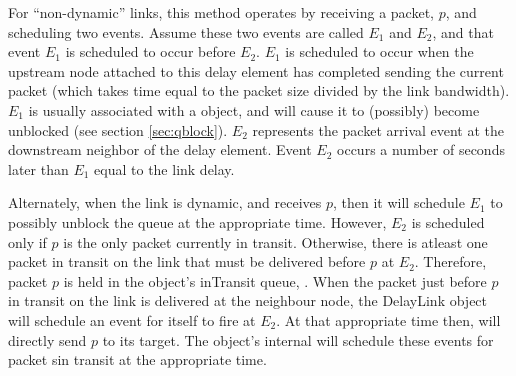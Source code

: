 For ``non-dynamic'' links,
this method operates by receiving a packet, $p$,  and scheduling two
events.
Assume these two events are called $E_1$ and $E_2$, and that
event $E_1$ is scheduled to occur before $E_2$.
$E_1$ is scheduled to occur when the upstream node attached to this
delay element has completed sending the current packet
(which takes time equal to the packet size divided by the link bandwidth).
$E_1$ is usually associated with a  object, and will
cause it to (possibly) become unblocked (see section \ref{sec:qblock}).
$E_2$ represents the packet arrival event at the downstream neighbor
of the delay element.
Event $E_2$ occurs a number of seconds later than $E_1$ equal to the
link delay.

Alternately, when the link is dynamic, and receives  $p$, then
it will schedule $E_1$ to possibly unblock the queue at the
appropriate time.
However, $E_2$ is scheduled only
if $p$ is the only packet currently in transit.
Otherwise, there is atleast one packet in transit on the link that must
be delivered before $p$ at $E_2$.
Therefore, packet $p$ is held in the object's inTransit queue, .
When the packet just before $p$ in transit on the link is delivered
at the neighbour node, 
the DelayLink object will schedule an event for itself to fire at $E_2$.
At that appropriate time then, 
will directly send $p$ to its target.
The object's internal
will schedule these events for packet sin transit at the appropriate time.




